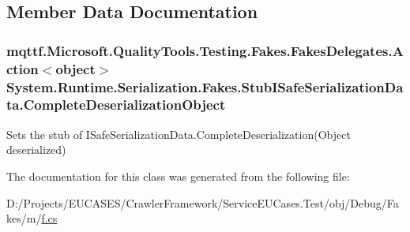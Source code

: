 \subsection{Member Data Documentation}
\hypertarget{class_system_1_1_runtime_1_1_serialization_1_1_fakes_1_1_stub_i_safe_serialization_data_a80e7eab771b8325866466276cc1c96be}{
\subsubsection[{Complete\-Deserialization\-Object}]{\setlength{\rightskip}{0pt plus 5cm}mqttf.\-Microsoft.\-Quality\-Tools.\-Testing.\-Fakes.\-Fakes\-Delegates.\-Action$<$object$>$ System.\-Runtime.\-Serialization.\-Fakes.\-Stub\-I\-Safe\-Serialization\-Data.\-Complete\-Deserialization\-Object}}\label{class_system_1_1_runtime_1_1_serialization_1_1_fakes_1_1_stub_i_safe_serialization_data_a80e7eab771b8325866466276cc1c96be}


Sets the stub of I\-Safe\-Serialization\-Data.\-Complete\-Deserialization(\-Object deserialized)



The documentation for this class was generated from the following file\-:\begin{DoxyCompactItemize}
\item 
D\-:/\-Projects/\-E\-U\-C\-A\-S\-E\-S/\-Crawler\-Framework/\-Service\-E\-U\-Cases.\-Test/obj/\-Debug/\-Fakes/m/\hyperlink{m_2f_8cs}{f.\-cs}\end{DoxyCompactItemize}
